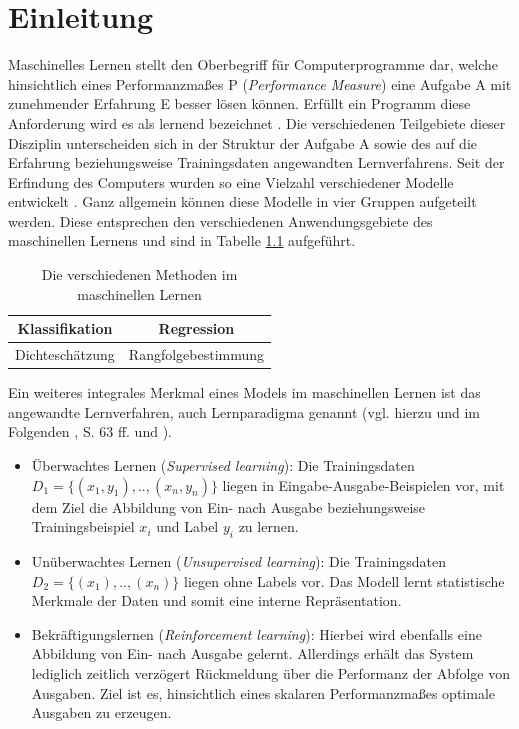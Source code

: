 \chapter{Einleitung}
\label{ch:Einleitung}
Maschinelles Lernen stellt den Oberbegriff für Computerprogramme dar, welche hinsichtlich eines Performanzmaßes P (\textit{Performance Measure}) eine Aufgabe A mit zunehmender Erfahrung E besser lösen können. Erfüllt ein Programm diese Anforderung wird es als lernend bezeichnet \cite[vgl.][S. 2]{Mitchell1997}.
Die verschiedenen Teilgebiete dieser Disziplin unterscheiden sich in der Struktur der Aufgabe A sowie des auf die Erfahrung beziehungsweise Trainingsdaten angewandten Lernverfahrens. Seit der Erfindung des Computers wurden so eine Vielzahl verschiedener Modelle entwickelt \cite[vgl. z.B.][]{Hastie2009}. Ganz allgemein können diese Modelle in vier  Gruppen aufgeteilt werden. Diese entsprechen den verschiedenen Anwendungsgebiete des maschinellen Lernens und sind in Tabelle \ref{tab:ml} aufgeführt.\\
\begin{table}[H]
\centering
\begin{tabular}{c|c}
Klassifikation  & Regression \\ 
\hline  Dichteschätzung & Rangfolgebestimmung \\ 
\end{tabular}
\caption{Die verschiedenen Methoden im maschinellen Lernen \cite[vgl.][S. 1 f.]{Hastie2009}} 
\label{tab:ml} 
\end{table}

Ein weiteres integrales Merkmal eines Models im maschinellen Lernen ist das angewandte Lernverfahren, auch Lernparadigma genannt (vgl. hierzu und im Folgenden \cite{Haykin1999}, S. 63 ff. und \cite{Becker1991}).
\begin{itemize}
\item Überwachtes Lernen (\textit{Supervised learning}): Die Trainingsdaten $D_1 =\{(x_1,y_1),..,(x_n,y_n)\}$ liegen in Eingabe-Ausgabe-Beispielen vor, mit dem Ziel die Abbildung von Ein- nach Ausgabe beziehungsweise Trainingsbeispiel $x_i$ und Label $y_i$ zu lernen.
\item Unüberwachtes Lernen (\textit{Unsupervised learning}): Die Trainingsdaten $D_2 =\{(x_1),..,(x_n)\}$  liegen ohne Labels vor. Das Modell lernt statistische Merkmale der Daten und somit eine interne Repräsentation.
\item Bekräftigungslernen (\textit{Reinforcement learning}): Hierbei wird ebenfalls eine Abbildung von Ein- nach Ausgabe gelernt. Allerdings erhält das System lediglich zeitlich verzögert Rückmeldung über die Performanz der Abfolge von Ausgaben. Ziel ist es, hinsichtlich eines skalaren Performanzmaßes optimale Ausgaben zu erzeugen. 
\end{itemize}


